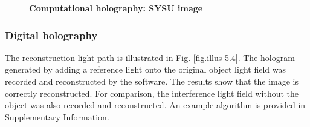 \documentclass[10pt,a4paper,twocolumn,twoside,UTF8]{article}
\begin{document}
		\begin{figure}[htbp]
			\centering
			\caption{\textbf{Computational holography: SYSU image}}
			\label{fig.4.2}
		\end{figure}

		\subsubsection{Digital holography}
		The reconstruction light path is illustrated in Fig. \ref{fig.illus-5.4}. 
		The hologram generated by adding a reference light onto the original object light field was recorded and reconstructed by the software.
		The results show that the image is correctly reconstructed. For comparison, the interference light field without the object was also recorded and reconstructed.
		An example algorithm is provided in Supplementary Information.
\end{document}
